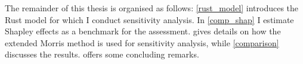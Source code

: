 
The remainder of this thesis is organised as follows: \cref{rust_model} introduces the Rust model for which I conduct sensitivity analysis. In \cref{comp_shap} I estimate Shapley effects as a benchmark for the assessment.  gives details on how the extended Morris method is used for sensitivity analysis, while \cref{comparison} discusses the results.  offers some concluding remarks.